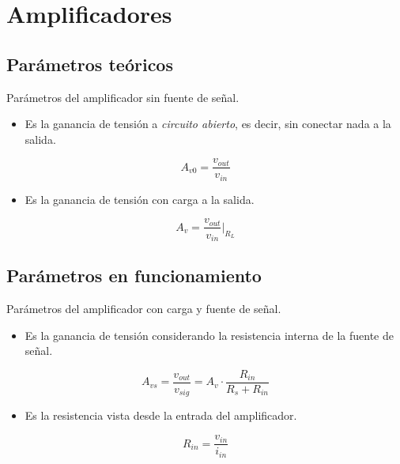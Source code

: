 \section{Amplificadores}

\subsection{Parámetros teóricos}
Parámetros del amplificador sin fuente de señal. 


\begin{itemize}
    \item Es la ganancia de tensión a \textit{circuito abierto}, es decir, sin conectar nada a la salida.
\end{itemize}
\begin{equation}
    A_{v0} = \frac{v_{out}}{v_{in}} 
\end{equation}

\begin{itemize}
    \item Es la ganancia de tensión con carga a la salida.
\end{itemize}
\begin{equation}
    A_{v} = \frac{v_{out}}{v_{in}} \Bigg|_{R_L}
\end{equation}

\subsection{Parámetros en funcionamiento}
Parámetros del amplificador con carga y fuente de señal. 

\begin{itemize}
    \item Es la ganancia de tensión considerando la resistencia interna de la fuente de señal.
\end{itemize}
\begin{equation}
    A_{vs} = \frac{v_{out}}{v_{sig}} = A_{v} \cdot \frac{R_{in}}{R_s + R_{in}}
\end{equation}

\begin{itemize}
    \item Es la resistencia vista desde la entrada del amplificador. 
\end{itemize}
\begin{equation}
    R_{in} = \frac{v_{in}}{i_{in}}
\end{equation}

